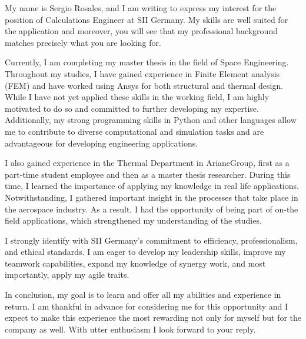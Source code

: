


\begin{cvletter}
My name is Sergio Rosales, and I am writing to express my interest for
the position of Calculations Engineer at SII Germany. My skills are
well suited for the application and moreover, you will see that my
professional background matches precisely what you are looking for.

Currently, I am completing my master thesis in the field of Space
Engineering. Throughout my studies, I have gained experience in Finite
Element analysis (FEM) and have worked using Ansys for both structural
and thermal design. While  I have not yet applied these skills in the
working field, I am highly motivated to do so and committed to further
developing my expertise. Additionally, my strong programming skills in
Python and other languages allow me to contribute to diverse
computational and simulation tasks and are advantageous for developing
engineering applications.

I also gained experience in the Thermal Department in ArianeGroup,
first as a part-time student employee and then as a master thesis
researcher. During this time, I learned the importance of applying my
knowledge in real life applications. Notwithstanding, I gathered
important insight in the processes that take place in the aerospace
industry. As a result, I had the opportunity of being part of on-the
field applications, which strengthened my understanding of the
studies.

I strongly identify with SII Germany's commitment to efficiency,
professionalism, and ethical standards. I am eager to develop my
leadership skills, improve my teamwork capabilities, expand my
knowledge of synergy work, and most importantly, apply my agile
traits.

In conclusion, my goal is to learn and offer all my abilities and
experience in return. I am thankful in advance for considering me for
this opportunity and I expect to make this experience the most
rewarding not only for myself but for the company as well.\hfill\break
With utter enthusiasm I look forward to your reply.
\end{cvletter}